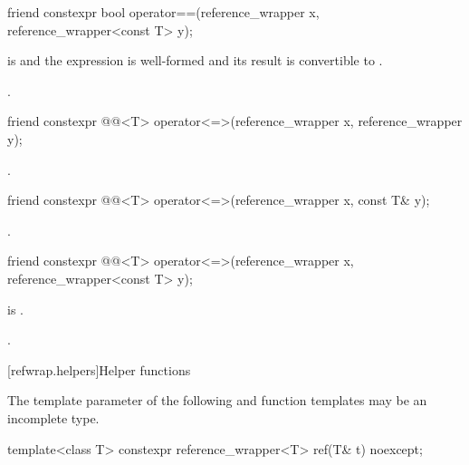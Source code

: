 \begin{itemdecl}
friend constexpr bool operator==(reference_wrapper x, reference_wrapper<const T> y);
\end{itemdecl}

\begin{itemdescr}
\pnum
\constraints
{} is  and
the expression  is well-formed and
its result is convertible to .

\pnum
\returns
{}.
\end{itemdescr}

\begin{itemdecl}
friend constexpr @@<T> operator<=>(reference_wrapper x, reference_wrapper y);
\end{itemdecl}

\begin{itemdescr}
\pnum
\returns
{}.
\end{itemdescr}

\begin{itemdecl}
friend constexpr @@<T> operator<=>(reference_wrapper x, const T& y);
\end{itemdecl}

\begin{itemdescr}
\pnum
\returns
{}.
\end{itemdescr}

\begin{itemdecl}
friend constexpr @@<T> operator<=>(reference_wrapper x,
                                                       reference_wrapper<const T> y);
\end{itemdecl}

\begin{itemdescr}
\pnum
\constraints
{} is .

\pnum
\returns
{}.
\end{itemdescr}

[refwrap.helpers]{Helper functions}

\pnum
The template parameter  of
the following  and  function templates
may be an incomplete type.

%
\begin{itemdecl}
template<class T> constexpr reference_wrapper<T> ref(T& t) noexcept;
\end{itemdecl}

